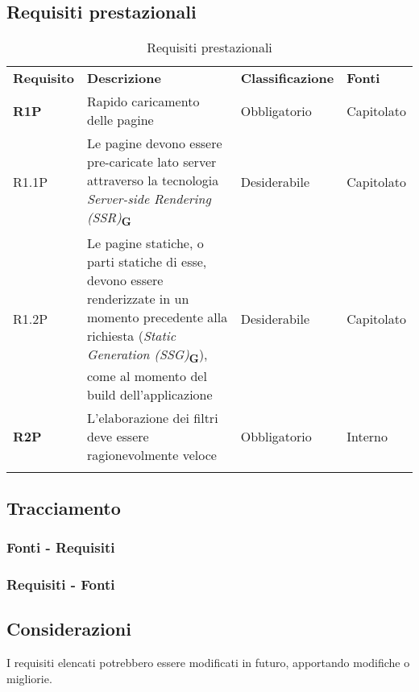 \subsection{Requisiti prestazionali}
\begin{center}
    \centering
    \renewcommand{\arraystretch}{1.8}
    \label{tab:RequisitiPrestazionali}
    \begin{longtable}[!h]{p{50px} p{200px} p{100px} p{50px}}
        \rowcolor{logo!70} \textbf{Requisito} & \textbf{Descrizione}                                                                                                                                                                                                       & \textbf{Classificazione} & \textbf{Fonti} \\
        \textbf{R1P}                          & Rapido caricamento delle pagine                                                                                                                                                                                            & Obbligatorio             & Capitolato     \\
        R1.1P                                 & Le pagine devono essere pre-caricate lato server attraverso la tecnologia \textit{Server-side Rendering (SSR)}\textsubscript{\textbf{G}}                                                                                   & Desiderabile             & Capitolato     \\
        R1.2P                                 & Le pagine statiche, o parti statiche di esse, devono essere renderizzate in un momento precedente alla richiesta (\textit{Static Generation (SSG)}\textsubscript{\textbf{G}}), come al momento del build dell'applicazione & Desiderabile             & Capitolato     \\
        \textbf{R2P}                          & L'elaborazione dei filtri deve essere ragionevolmente veloce                                                                                                                                                                      & Obbligatorio             & Interno        \\
        \rowcolor{white}\caption{Requisiti prestazionali}
    \end{longtable}
\end{center}

\newpage
\subsection{Tracciamento}
\subsubsection{Fonti - Requisiti}


\newpage
\subsubsection{Requisiti - Fonti}


\subsection{Considerazioni}
I requisiti elencati potrebbero essere modificati in futuro, apportando modifiche o migliorie.
